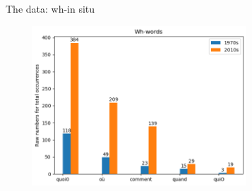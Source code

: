 \documentclass[lesson_slides]{subfiles}
\begin{document}
\begin{frame}[c]{The data: wh-in situ}

    \begin{center}
       \includegraphics[width=10cm, height=6cm]{images/insituraw2.png} 
    \end{center}
  
\end{frame}
\end{document}
